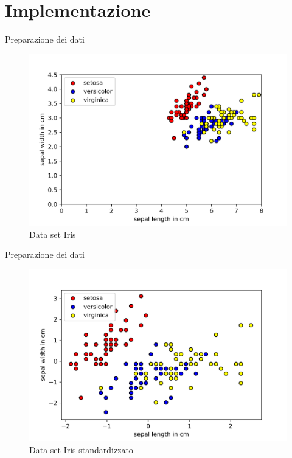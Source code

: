 \documentclass{beamer}
\begin{document}
    \section{Implementazione}

    \begin{frame}{Preparazione dei dati}
        \begin{figure}[h]
            \centering
            \includegraphics[width=.8\textwidth]{gfx/iris/iris4features}
            \caption{Data set Iris}
            \label{}
        \end{figure}
    \end{frame}

    \begin{frame}{Preparazione dei dati}
        \begin{figure}[h]
            \centering
            \includegraphics[width=.8\textwidth]{gfx/iris/irisscaled}
            \caption{Data set Iris standardizzato}
            \label{}
        \end{figure}
    \end{frame}
\end{document}
